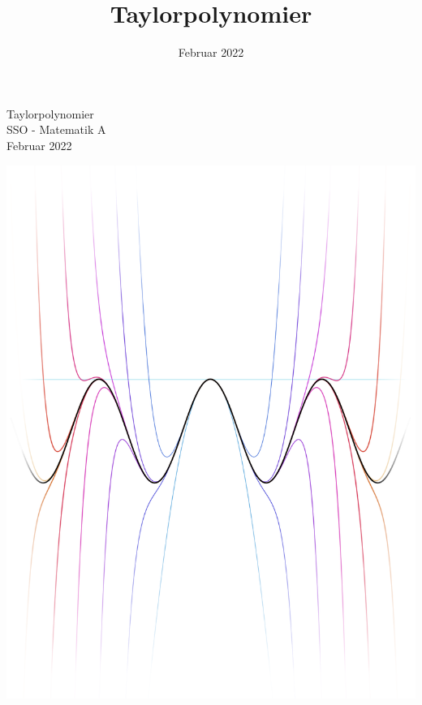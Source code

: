 \documentclass[12pt, a4paper]{article}
\title{Taylorpolynomier}
\date{Februar 2022}
\begin{document}
\begin{refsection}
\begin{titlepage}
   \centering
    \vfill
    {\huge 
    Taylorpolynomier\\
    \vspace{0.5cm}
    \large
    SSO - Matematik A\\
    \vspace{0.25cm}
    Februar 2022
    }    
    \vfill
   
    \includegraphics[width=\textwidth]{figures/forside4edit.png} %
    \vfill
    \vfill
\thispagestyle{empty}

\end{titlepage}

\end{refsection}
\end{document}
